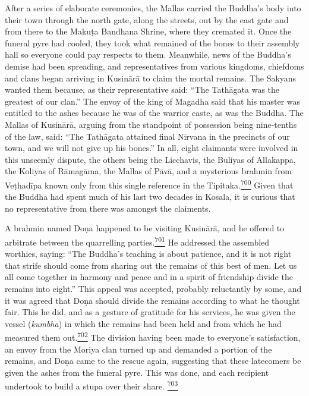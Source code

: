 After a series of elaborate ceremonies, the Mallas carried the Buddha's
body into their town through the north gate, along the streets, out by
the east gate and from there to the Makuṭa Bandhana Shrine, where they
cremated it. Once the funeral pyre had cooled, they took what remained
of the bones to their assembly hall so everyone could pay respects to
them. Meanwhile, news of the Buddha's demise had been spreading, and
representatives from various kingdoms, chiefdoms and clans began
arriving in Kusinārā to claim the mortal remains. The Sakyans wanted
them because, as their representative said: ``The Tathāgata was the
greatest of our clan.'' The envoy of the king of Magadha said that his
master was entitled to the ashes because he was of the warrior caste, as
was the Buddha. The Mallas of Kusinārā, arguing from the standpoint of
possession being nine-tenths of the law, said: ``The Tathāgata attained
final Nirvana in the precincts of our town, and we will not give up his
bones.'' In all, eight claimants were involved in this unseemly dispute,
the others being the Licchavis, the Buliyas of Allakappa, the Koliyas of
Rāmagāma, the Mallas of Pāvā, and a mysterious brahmin from Veṭhadīpa
known only from this single reference in the
Tipitaka.\label{footprints_split_018.html_fnref700}\hyperref[footprints_split_025.htmlux5cux23fn700]{\textsuperscript{700}}
Given that the Buddha had spent much of his last two decades in Kosala,
it is curious that no representative from there was amongst the
claiments.

A brahmin named Doṇa happened to be visiting Kusinārā, and he offered to
arbitrate between the quarrelling
parties.\label{footprints_split_018.html_fnref701}\hyperref[footprints_split_025.htmlux5cux23fn701]{\textsuperscript{701}}
He addressed the assembled worthies, saying: ``The Buddha's teaching is
about patience, and it is not right that strife should come from sharing
out the remains of this best of men. Let us all come together in harmony
and peace and in a spirit of friendship divide the remains into eight.''
This appeal was accepted, probably reluctantly by some, and it was
agreed that Doṇa should divide the remains according to what he thought
fair. This he did, and as a gesture of gratitude for his services, he
was given the vessel (\emph{kumbha}) in which the remains had been held
and from which he had measured them
out.\label{footprints_split_018.html_fnref702}\hyperref[footprints_split_025.htmlux5cux23fn702]{\textsuperscript{702}}
The division having been made to everyone's satisfaction, an envoy from
the Moriya clan turned up and demanded a portion of the remains, and
Doṇa came to the rescue again, suggesting that these latecomers be given
the ashes from the funeral pyre. This was done, and each recipient
undertook to build a stupa over their share.
\label{footprints_split_018.html_fnref703}\hyperref[footprints_split_025.htmlux5cux23fn703]{\textsuperscript{703}}

